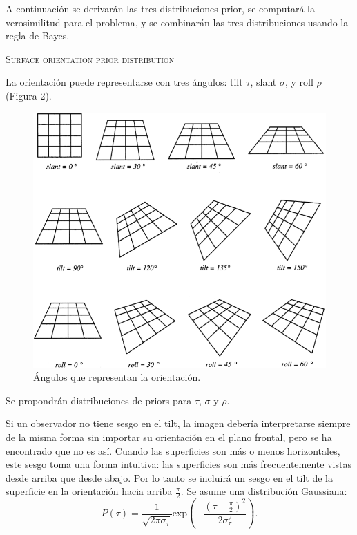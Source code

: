 \documentclass[a4paper,12pt]{article}
\begin{document}
A continuación se derivarán las tres distribuciones prior, se computará la verosimilitud para el problema, y se combinarán las tres distribuciones usando la regla de Bayes.

{\scshape Surface orientation prior distribution}

La orientación puede representarse con tres ángulos: tilt $\tau$, slant $\sigma$, y roll $\rho$ (Figura 2).

\begin{figure}[hb]
	\begin{center}
		\includegraphics[scale=0.5]{Mamassian1998(2).png}
		\caption{Ángulos que representan la orientación.}
	\end{center}
\end{figure}

Se propondrán distribuciones de priors para $\tau$, $\sigma$ y $\rho$.

Si un observador no tiene sesgo en el tilt, la imagen debería interpretarse siempre de la misma forma sin importar su orientación en el plano frontal, pero se ha encontrado que no es así. Cuando las superficies son más o menos horizontales, este sesgo toma una forma intuitiva: las superficies son más frecuentemente vistas desde arriba que desde abajo. Por lo tanto se incluirá un sesgo en el tilt de la superficie en la orientación hacia arriba $\frac{\pi}{2}$. Se asume una distribución Gaussiana:
\begin{equation}
	P(\tau)
	=
	\frac{
		1
	}{
	\sqrt{2\pi \sigma_{\tau}}
	}
	\mbox{exp}
	\left(
		-\frac{
			(\tau-\frac{\pi}{2})^{2}
		}{
			2\sigma_{\tau}^{2}
		}\right).
\end{equation}
\end{document}
